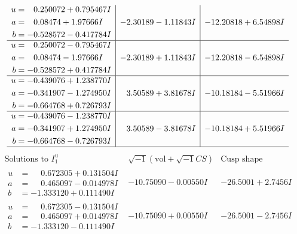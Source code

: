 \documentclass[1p]{elsarticle_modified}
\theoremstyle{definition}
\newcommand{\I}{\sqrt{-1}}
\begin{document}
$$\begin{array}{c|c|c}
\begin{aligned}
u &= \phantom{-}0.250072 + 0.795467 I \\
a &= \phantom{-}0.08474 + 1.97666 I \\
b &= -0.528572 - 0.417784 I\end{aligned}
 & -2.30189 - 1.11843 I & -12.20818 + 6.54898 I \\ \hline\begin{aligned}
u &= \phantom{-}0.250072 - 0.795467 I \\
a &= \phantom{-}0.08474 - 1.97666 I \\
b &= -0.528572 + 0.417784 I\end{aligned}
 & -2.30189 + 1.11843 I & -12.20818 - 6.54898 I \\ \hline\begin{aligned}
u &= -0.439076 + 1.238770 I \\
a &= -0.341907 - 1.274950 I \\
b &= -0.664768 + 0.726793 I\end{aligned}
 & \phantom{-}3.50589 + 3.81678 I & -10.18184 - 5.51966 I \\ \hline\begin{aligned}
u &= -0.439076 - 1.238770 I \\
a &= -0.341907 + 1.274950 I \\
b &= -0.664768 - 0.726793 I\end{aligned}
 & \phantom{-}3.50589 - 3.81678 I & -10.18184 + 5.51966 I\\
 \hline 
 \end{array}$$\newpage$$\begin{array}{c|c|c}  
\text{Solutions to }I^u_{1}& \I (\text{vol} + \sqrt{-1}CS) & \text{Cusp shape}\\
 \hline 
\begin{aligned}
u &= \phantom{-}0.672305 + 0.131504 I \\
a &= \phantom{-}0.465097 - 0.014978 I \\
b &= -1.333120 + 0.111490 I\end{aligned}
 & -10.75090 - 0.00550 I & -26.5001 + 2.7456 I \\ \hline\begin{aligned}
u &= \phantom{-}0.672305 - 0.131504 I \\
a &= \phantom{-}0.465097 + 0.014978 I \\
b &= -1.333120 - 0.111490 I\end{aligned}
 & -10.75090 + 0.00550 I & -26.5001 - 2.7456 I \\ \hline\begin{aligned}

\end{aligned}
\end{array}$$
\end{document}
